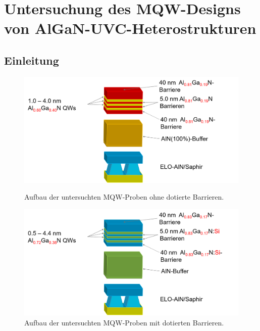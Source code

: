 \thispagestyle{fancy}
\justifying

\chapter{Untersuchung des MQW-Designs von AlGaN-UVC-Heterostrukturen}
\label{chap:mqw}
\section{Einleitung}


%
\begin{figure}[H]
  \centering
  \begin{minipage}[t]{0.49\textwidth}
    \centering
    \includegraphics[width=\textwidth]{Bilder/MQWdickenSerie/undotiert}
		\caption{Aufbau der untersuchten MQW-Proben ohne dotierte Barrieren.}
    \label{fig:undotiert}
  \end{minipage}
	\hfill
  \begin{minipage}[t]{0.49\textwidth}
    \centering
    \includegraphics[width=\linewidth]{Bilder/MQWdickenSerie/dotiert}
		\caption{Aufbau der untersuchten MQW-Proben mit dotierten Barrieren.}
    \label{fig:dotiert}
  \end{minipage}
\end{figure}
\noindent 
